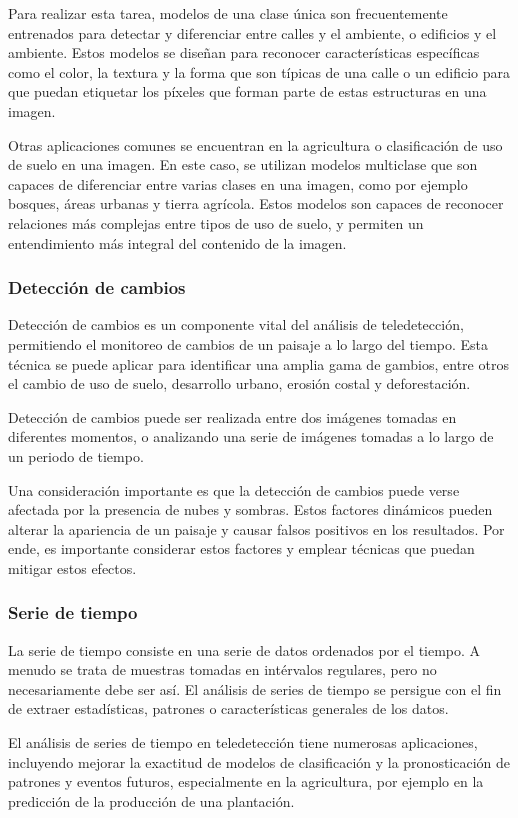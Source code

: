 Para realizar esta tarea, modelos de una clase única son frecuentemente entrenados para detectar y diferenciar entre
calles y el ambiente, o edificios y el ambiente. Estos modelos se diseñan para reconocer características específicas
como el color, la textura y la forma que son típicas de una calle o un edificio para que puedan etiquetar los píxeles
que forman parte de estas estructuras en una imagen. \autocite{cole-segmentation}

Otras aplicaciones comunes se encuentran en la agricultura o clasificación de uso de suelo en una imagen. En este caso,
se utilizan modelos multiclase que son capaces de diferenciar entre varias clases en una imagen, como por ejemplo
bosques, áreas urbanas y tierra agrícola. Estos modelos son capaces de reconocer relaciones más complejas entre tipos
de uso de suelo, y permiten un entendimiento más integral del contenido de la imagen. \autocite{cole-segmentation}

\subsubsection{Detección de cambios}

Detección de cambios es un componente vital del análisis de teledetección, permitiendo el monitoreo de cambios de un
paisaje a lo largo del tiempo. Esta técnica se puede aplicar para identificar una amplia gama de gambios, entre otros
el cambio de uso de suelo, desarrollo urbano, erosión costal y deforestación. \autocite{repo-satellite-image-dl}

Detección de cambios puede ser realizada entre dos imágenes tomadas en diferentes momentos, o analizando una serie de
imágenes tomadas a lo largo de un periodo de tiempo. \autocite{repo-satellite-image-dl}

Una consideración importante es que la detección de cambios puede verse afectada por la presencia de nubes y sombras.
Estos factores dinámicos pueden alterar la apariencia de un paisaje y causar falsos positivos en los resultados. Por
ende, es importante considerar estos factores y emplear técnicas que puedan mitigar estos efectos.
\autocite{repo-satellite-image-dl}

\subsubsection{Serie de tiempo}

La serie de tiempo consiste en una serie de datos ordenados por el tiempo. A menudo se trata de muestras tomadas en
intérvalos regulares, pero no necesariamente debe ser así. El análisis de series de tiempo se persigue con el fin de
extraer estadísticas, patrones o características generales de los datos.

El análisis de series de tiempo en teledetección tiene numerosas aplicaciones, incluyendo mejorar la exactitud de
modelos de clasificación y la pronosticación de patrones y eventos futuros, especialmente en la agricultura, por
ejemplo en la predicción de la producción de una plantación. \autocite{repo-satellite-image-dl}
